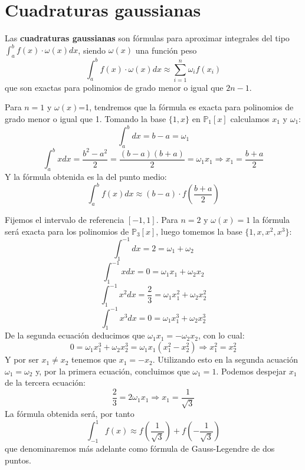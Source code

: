 \section{Cuadraturas gaussianas}
\begin{defin} Las \textbf{cuadraturas gaussianas} son fórmulas para aproximar integrales del tipo $\displaystyle \int_a^b f(x)\cdot \omega(x)dx$, siendo $\omega(x)$ una función peso
$$\int_a^b f(x)\cdot \omega(x)dx\approx\sum_{i=1}^n\omega_if(x_i)$$
que son exactas para polinomios de grado menor o igual que $2n-1$.   
\end{defin}                            
\begin{ejem}
 Para $n=1$ y $\omega(x)$=1, tendremos que la fórmula es exacta para polinomios de grado menor o igual que 1. Tomando la base $\{1,x\}$ en $\mathbb{P}_1[x]$ calculamos $x_1$ y $\omega_1$:
 $$\int_a^bdx=b-a=\omega_1$$
 $$\int_a^bxdx=\dfrac{b^2-a^2}{2}=\dfrac{(b-a)(b+a)}{2}=\omega_1x_1\Longrightarrow x_1=\dfrac{b+a}{2}$$
 Y la fórmula obtenida es la del punto medio:
 $$\int_a^bf(x)dx\approx(b-a)\cdot f\left(\dfrac{b+a}{2}\right)$$
\end{ejem}
\begin{ejem}
Fijemos el intervalo de referencia $[-1,1]$. Para $n=2$ y $\omega(x)=1$ la fórmula será exacta para los polinomios de $\mathbb{P}_3[x]$, luego tomemos la base $\{1,x,x^2,x^3\}$:
$$\int_1^{-1}dx=2=\omega_1+\omega_2$$
$$\int_1^{-1}xdx=0=\omega_1x_1+\omega_2x_2$$
$$\int_1^{-1}x^2dx=\dfrac{2}{3}=\omega_1x_1^2+\omega_2x_2^2$$
$$\int_1^{-1}x^3dx=0=\omega_1x_1^3+\omega_2x_2^3$$
De la segunda ecuación deducimos que $\omega_1x_1=-\omega_2x_2$, con lo cual:
$$0=\omega_1x_1^3+\omega_2x_2^3=\omega_1x_1(x_1^2-x_2^2)\Rightarrow x_1^2=x_2^2$$
Y por ser $x_1\neq x_2$ tenemos que $x_1=-x_2$. Utilizando esto en la segunda acuación $\omega_1=\omega_2$ y, por la primera ecuación, concluimos que $\omega_1=1$. Podemos despejar $x_1$ de la tercera ecuación:
$$\dfrac{2}{3}=2\omega_1 x_1\Rightarrow x_1=\dfrac{1}{\sqrt{3}}$$
La fórmula obtenida será, por tanto
$$\int_{-1}^1f(x)\approx f\left(\dfrac{1}{\sqrt{3}}\right)+f\left(-\dfrac{1}{\sqrt{3}}\right)$$
que denominaremos más adelante como fórmula de Gauss-Legendre de dos puntos.
\end{ejem}

